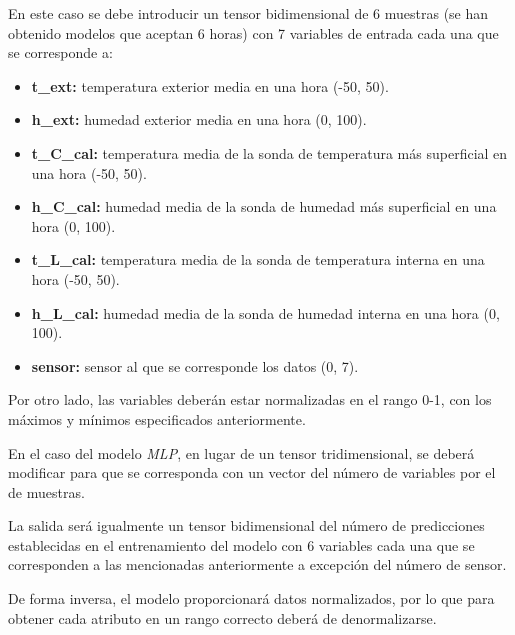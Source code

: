 En este caso se debe introducir un tensor bidimensional de 6 muestras (se han obtenido modelos que aceptan 6 horas) con 7 variables de entrada cada una que se corresponde a:
\begin{itemize}
    \item \textbf{t\_ext:} temperatura exterior media en una hora (-50, 50).
    \item \textbf{h\_ext:} humedad exterior media en una hora (0, 100).
    \item \textbf{t\_C\_cal:} temperatura media de la sonda de temperatura más superficial en una hora (-50, 50).
    \item \textbf{h\_C\_cal:} humedad media de la sonda de humedad más superficial en una hora (0, 100).
    \item \textbf{t\_L\_cal:} temperatura media de la sonda de temperatura interna en una hora (-50, 50).
    \item \textbf{h\_L\_cal:} humedad media de la sonda de humedad interna en una hora (0, 100).
    \item \textbf{sensor:} sensor al que se corresponde los datos (0, 7).
\end{itemize}

Por otro lado, las variables deberán estar normalizadas en el rango 0-1, con los máximos y mínimos especificados anteriormente.

En el caso del modelo \textit{MLP}, en lugar de un tensor tridimensional, se deberá modificar para que se corresponda con un vector del número de variables por el de muestras.

La salida será igualmente un tensor bidimensional del número de predicciones establecidas en el entrenamiento del modelo con 6 variables cada una que se corresponden a las mencionadas
anteriormente a excepción del número de sensor. 

De forma inversa, el modelo proporcionará datos normalizados, por lo que para obtener cada atributo en un rango correcto deberá de denormalizarse.
